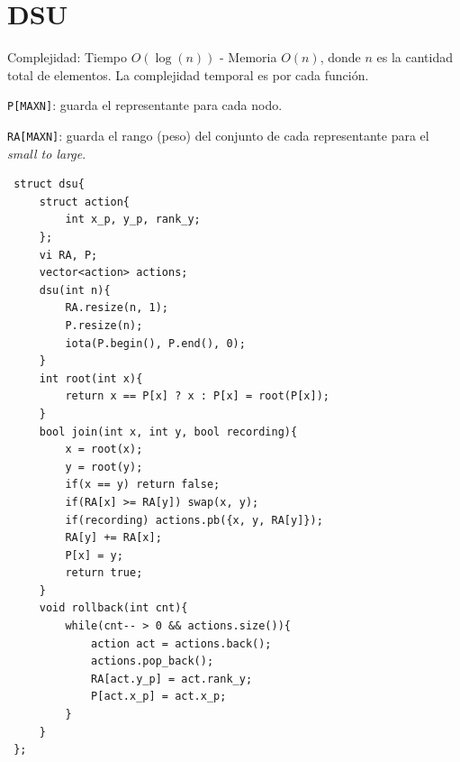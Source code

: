 \section{DSU}
 Complejidad: Tiempo $O(\log(n))$ - Memoria $O(n)$, donde $n$ es la cantidad total de elementos. La complejidad temporal es por cada función.
 \par \texttt{P[MAXN]}: guarda el representante para cada nodo.
 \par \texttt{RA[MAXN]}: guarda el rango (peso) del conjunto de cada representante para el \textit{small to large}.
 \begin{verbatim}
 struct dsu{
     struct action{
         int x_p, y_p, rank_y;
     };
     vi RA, P;
     vector<action> actions;
     dsu(int n){
         RA.resize(n, 1);
         P.resize(n);
         iota(P.begin(), P.end(), 0);
     }
     int root(int x){
         return x == P[x] ? x : P[x] = root(P[x]);
     }
     bool join(int x, int y, bool recording){
         x = root(x);
         y = root(y);
         if(x == y) return false;
         if(RA[x] >= RA[y]) swap(x, y);
         if(recording) actions.pb({x, y, RA[y]});
         RA[y] += RA[x];
         P[x] = y;
         return true;
     }
     void rollback(int cnt){
         while(cnt-- > 0 && actions.size()){
             action act = actions.back();
             actions.pop_back();
             RA[act.y_p] = act.rank_y;
             P[act.x_p] = act.x_p;
         }
     }
 };
\end{verbatim}